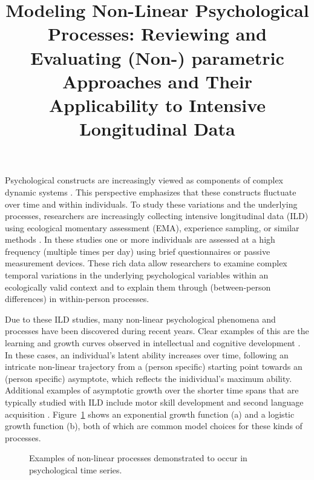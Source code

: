 \documentclass[man, floatsintext]{apa7}
\title{Modeling Non-Linear Psychological Processes: Reviewing and Evaluating
  (Non-) parametric Approaches and Their Applicability to Intensive
  Longitudinal
  Data}
\begin{document}
\maketitle

Psychological constructs are increasingly viewed as components of complex
dynamic systems \parencite{nesselroade_studying_2004, wang_investigating_2012}.
This perspective emphasizes that these constructs fluctuate over time and
within individuals. To study these variations and the underlying processes,
researchers are increasingly collecting intensive longitudinal data (ILD) using
ecological momentary assessment (EMA), experience sampling, or similar methods
\parencite{fritz_so_2023}. In these studies one or more individuals are
assessed at a high frequency (multiple times per day) using brief
questionnaires or passive measurement devices. These rich data allow
researchers to examine complex temporal variations in the underlying
psychological variables within an ecologically valid context and to explain
them through (between-person differences) in within-person processes.

Due to these ILD studies, many non-linear psychological phenomena and processes
have been discovered during recent years. Clear examples of this are the
learning and growth curves observed in intellectual and cognitive development
\parencite{kunnen_dynamic_2012, mcardle_comparative_2002}. In these cases, an
individual's latent ability increases over time, following an intricate
non-linear trajectory from a (person specific) starting point towards an
(person specific) asymptote, which reflects the inidividual's
maximum ability. Additional examples of asymptotic growth over the shorter
time spans that are typically studied with ILD include
motor skill development \parencite{newell_time_2001} and second language
acquisition \parencite{de_bot_dynamic_2007}. Figure~\ref{fig:examplar_npn}
shows an exponential growth function (a) and a logistic growth function (b),
both of which are common model choices for these kinds of processes.

\begin{figure}[!ht]
  \caption{Examples of non-linear processes demonstrated to occur in
    psychological time series.}
  \label{fig:examplar_npn}
\end{figure}
\end{document}
